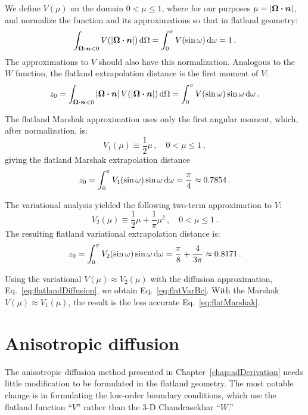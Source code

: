 We define $V(\mu)$ on the domain $0 < \mu \le 1$, where for our purposes $\mu =
\left| \bm{\Omega} \bm{\cdot} \bm{n} \right|$, and normalize the function and its
approximations so that in flatland geometry:
\begin{equation*}
  \int_{\bm{\Omega}\bm{\cdot}\bm{n} < 0} V( \left| \bm{\Omega}\bm{\cdot}\bm{n} \right|) \mathop{}\!\mathrm{d}\Omega
  = \int_{0}^{\pi} V(\sin\omega) \mathop{}\!\mathrm{d}\omega
  = 1 \,.
\end{equation*}
The approximations to $V$ should also have this normalization. Analogous to the
$W$ function, the flatland extrapolation distance is the first moment of $V$:
\begin{equation*}
  z_0 = \int_{\bm{\Omega}\bm{\cdot}\bm{n} < 0} \left| \bm{\Omega}\bm{\cdot}\bm{n} \right|
    V( \left| \bm{\Omega}\bm{\cdot}\bm{n} \right|) \mathop{}\!\mathrm{d}\Omega
  = \int_{0}^{\pi} V(\sin\omega) \sin\omega \mathop{}\!\mathrm{d}\omega \,.
\end{equation*}

The flatland Marshak approximation uses only the first angular moment, which,
after normalization, is:
\begin{equation}\label{eq:flatV1}
  V_1(\mu) \equiv \frac{1}{2} \mu \,,
  \quad 0 < \mu \le 1 \,,
\end{equation}
giving the flatland Marshak extrapolation distance
\begin{equation*}
 z_0 = \int_{0}^{\pi} V_1(\sin\omega) \sin\omega \mathop{}\!\mathrm{d}\omega
  = \frac{\pi}{4} \approx 0.7854 \,.
\end{equation*}

The variational analysis yielded the following two-term approximation to $V$:
\begin{equation}\label{eq:flatV2}
  V_2(\mu) \equiv \frac{1}{2} \mu + \frac{1}{\pi}\mu^2 \,,
  \quad 0 < \mu \le 1 \,.
\end{equation}
The resulting flatland variational extrapolation distance is:
\begin{equation*}
 z_0 = \int_{0}^{\pi} V_2(\sin\omega) \sin\omega \mathop{}\!\mathrm{d}\omega
  = \frac{\pi}{8} + \frac{4}{3\pi} \approx 0.8171\,.
\end{equation*}

Using the variational $V(\mu)\approx V_2(\mu)$ with the diffusion
approximation, Eq.~\eqref{eq:flatlandDiffusion}, we obtain
Eq.~\eqref{eq:flatVarBc}. With the Marshak $V(\mu)\approx V_1(\mu)$, the result
is the less accurate Eq.~\eqref{eq:flatMarshak}.

\thesisclearpage

\section{Anisotropic diffusion}
The anisotropic diffusion method presented in
Chapter~\ref{chap:adDerivation} needs little modification to be formulated
in the flatland geometry. The most notable change is in formulating the
low-order boundary conditions, which use the flatland function ``$V$'' rather
than the 3-D Chandrasekhar ``$W$.''

